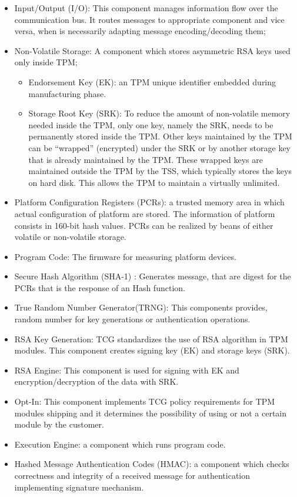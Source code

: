 \documentclass[../tesi.tex]{subfiles}
\begin{document}
\begin{itemize}
\item Input/Output (I/O): This component manages information flow over the communication bus. It routes messages to appropriate component and vice versa, when is necessarily adapting message encoding/decoding them;
\item Non-Volatile Storage: A component which stores asymmetric RSA \cite{jonsson2003public} keys used only inside TPM;
\begin{itemize}
\item Endorsement Key (EK): an TPM unique identifier embedded during manufacturing phase.
\item Storage Root Key (SRK): To reduce the amount of non-volatile memory needed inside the TPM, only one key, namely the SRK, needs to be permanently stored inside the TPM. Other
keys maintained by the TPM can be “wrapped” (encrypted) under the SRK or by another storage key that is already maintained by the TPM. These wrapped keys are maintained outside the TPM by the TSS, which typically stores the keys on hard disk. This allows the TPM to maintain a virtually unlimited. 
\end{itemize}
\item Platform Configuration Registers (PCRs): a trusted memory area in which actual configuration of platform are stored. The information of platform consists in 160-bit hash values. PCRs can be realized by beans of either volatile or non-volatile storage. 
\item Program Code: The firmware for measuring platform devices.
\item Secure Hash Algorithm (SHA-1) \cite{eastlake2011us}: Generates message, that are digest for the PCRs that is the response of an Hash function.
\item True Random Number Generator(TRNG): This components provides, random number for key generations or authentication operations.
\item RSA Key Generation: TCG standardizes the use of RSA algorithm in TPM modules. This component creates signing key (EK) and storage keys (SRK).
\item RSA Engine: This component is used for signing with EK and encryption/decryption of the data with SRK. 
\item Opt-In: This component implements TCG policy requirements for TPM modules shipping and it determines the possibility of using or not a certain module by the customer. 
\item Execution Engine: a component which runs program code.
\item Hashed Message Authentication Codes (HMAC): a component which checks correctness and integrity of a received message for authentication implementing signature mechanism. 
\end{itemize}
\end{document}

